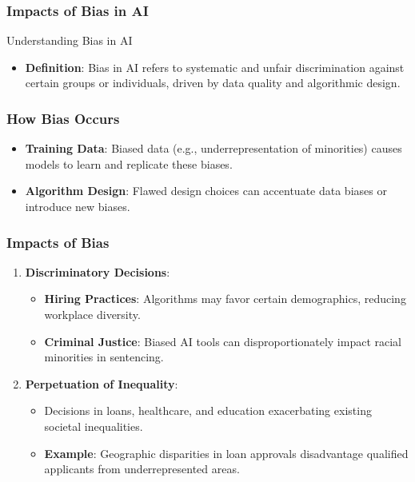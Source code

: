 \documentclass[aspectratio=169]{beamer}
\begin{document}
\begin{frame}[fragile]
    \frametitle{Impacts of Bias in AI}
    \begin{block}{Understanding Bias in AI}
        \begin{itemize}
            \item \textbf{Definition}: Bias in AI refers to systematic and unfair discrimination against certain groups or individuals, driven by data quality and algorithmic design.
        \end{itemize}
    \end{block}
\end{frame}

\begin{frame}[fragile]
    \frametitle{How Bias Occurs}
    \begin{itemize}
        \item \textbf{Training Data}: Biased data (e.g., underrepresentation of minorities) causes models to learn and replicate these biases.
        \item \textbf{Algorithm Design}: Flawed design choices can accentuate data biases or introduce new biases.
    \end{itemize}
\end{frame}

\begin{frame}[fragile]
    \frametitle{Impacts of Bias}
    \begin{enumerate}
        \item \textbf{Discriminatory Decisions}:
            \begin{itemize}
                \item \textbf{Hiring Practices}: Algorithms may favor certain demographics, reducing workplace diversity.
                \item \textbf{Criminal Justice}: Biased AI tools can disproportionately impact racial minorities in sentencing.
            \end{itemize}
        \item \textbf{Perpetuation of Inequality}:
            \begin{itemize}
                \item Decisions in loans, healthcare, and education exacerbating existing societal inequalities.
                \item \textbf{Example}: Geographic disparities in loan approvals disadvantage qualified applicants from underrepresented areas.
            \end{itemize}
    \end{enumerate}
\end{frame}
\end{document}
